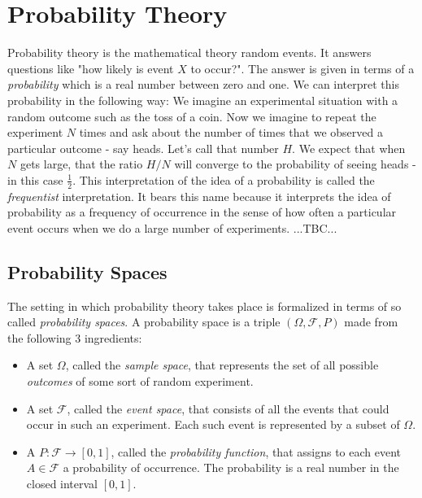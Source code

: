 \section{Probability Theory}
Probability theory is the mathematical theory random events. It answers questions like "how likely is event $X$ to occur?". The answer is given in terms of a \emph{probability} which is a real number between zero and one. We can interpret this probability in the following way: We imagine an experimental situation with a random outcome such as the toss of a coin. Now we imagine to repeat the experiment $N$ times and ask about the number of times that we observed a particular outcome - say heads. Let's call that number $H$. We expect that when $N$ gets large, that the ratio $H/N$ will converge to the probability of seeing heads - in this case $\frac{1}{2}$. This interpretation of the idea of a probability is called the \emph{frequentist} interpretation. It bears this name because it interprets the idea of probability as a frequency of occurrence in the sense of how often a particular event occurs when we do a large number of experiments.  ...TBC...


\subsection{Probability Spaces}
The setting in which probability theory takes place is formalized in terms of so called \emph{probability spaces}. A probability space is a triple $(\Omega, \mathcal{F}, P)$ made from the following 3 ingredients: 

\begin{itemize}

\item 
A set $\Omega$, called the \emph{sample space}, that represents the set of all possible \emph{outcomes} of some sort of random experiment.

\item
A set $\mathcal{F}$, called the \emph{event space}, that consists of all the events that could occur in such an experiment. Each such event is represented by a subset of $\Omega$.

\item 
A  $P: \mathcal{F} \rightarrow [0,1]$, called the \emph{probability function}, that assigns to each event $A \in \mathcal{F}$ a probability of occurrence. The probability is a real number in the closed interval $[0,1]$.

\end{itemize}

